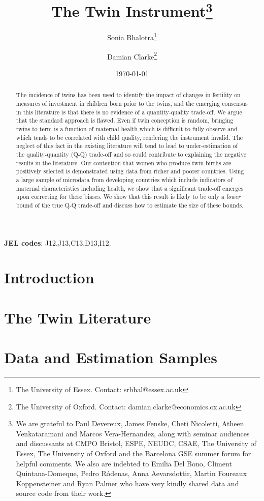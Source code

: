\documentclass{article}[11pt,subeqn]
\title{The Twin Instrument\footnote{We are grateful to Paul Devereux, 
James Fenske, Cheti Nicoletti, Atheen Venkataramani and Marcos Vera-Hernandez, 
along with seminar audiences and discussants at CMPO Bristol, ESPE, NEUDC, CSAE, 
The University of Essex, The University of Oxford and the Barcelona GSE summer 
forum for helpful comments.  We also are indebted to Emilia Del Bono, Climent 
Quintana-Domeque, Pedro R\'odenas, Anna Aevarsdottir, Martin Foureaux 
Koppensteiner and Ryan Palmer who have very kindly shared data and source code 
from their work.}}
\author{Sonia Bhalotra\thanks{The University of Essex.
Contact: srbhal@essex.ac.uk} 
\and Damian Clarke\thanks{The University of Oxford. 
Contact: damian.clarke@economics.ox.ac.uk}}
\date{\today}
\begin{document}
\begin{spacing}{1.4}

\maketitle
\begin{abstract}
 The incidence of twins has been used to identify the impact of changes in 
 fertility on measures of investment in children born prior to the twins, and
 the emerging consensus in this literature is that there is no evidence of a
 quantity-quality trade-off. We argue that the standard approach is flawed.
 Even if twin conception is random, bringing twins to term is a function of
 maternal health which is difficult to fully observe and which tends to be
 correlated with child quality, rendering the instrument invalid. The neglect
 of this fact in the existing literature will tend to lead to
 under-estimation of the quality-quantity (Q-Q) trade-off and so could
 contribute to explaining the negative results in the literature. Our contention
 that women who produce twin births are positively selected is demonstrated using
 data from richer and poorer countries. Using a large sample of microdata from
 developing countries which include indicators of maternal characteristics
 including health, we show that a significant trade-off emerges upon correcting
 for these biases. We show that this result is likely to be only a \emph{lower}
 bound of the true Q-Q trade-off and discuss how to estimate the size of these
 bounds.
 \\
\end{abstract}
\hspace{4mm}\textbf{\small JEL codes}: J12,J13,C13,D13,I12. \\

\newpage
\section{Introduction}                             \label{TWINscn:intro}
\section{The Twin Literature}                      \label{TWINscn:literature}
\section{Data and Estimation Samples}              \label{TWINscn:data}

\end{spacing}
\end{document}
